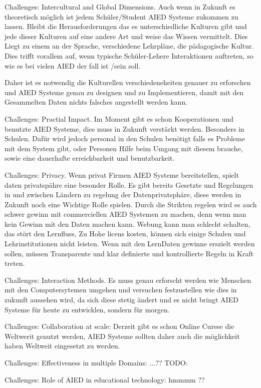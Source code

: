 Challenges: Intercultural and Global Dimensions. Auch wenn in Zukunft es theoretisch möglich ist jedem Schüler/Student AIED Systeme zukommen zu lassen.
 Bleibt die Herausforderungen das es unterschiedliche Kulturen gibt und jede dieser Kulturen auf eine andere Art und weise das Wissen vermittelt. Dies Liegt zu einem an der Sprache, 
 verschiedene Lehrpläne, die pädagogische Kultur. Dies trifft vorallem auf, wenn typische Schüler-Lehere Interaktionen auftreten, so wie es bei vielen AIED der fall ist /sein soll.

 Daher ist es notwendig die Kulturellen verschiedeneheiten genauer zu erforschen und AIED Systeme genau zu designen und zu Implementieren, damit mit den Gesammelten Daten nichts falsches angestellt werden kann.

 Challenges: Practial Impact. Im Moment gibt es schon Kooperationen und benutzte AIED Systeme, dies muss in Zukunft verstärkt werden. Besonders in Schulen. Dafür wird jedoch personal in den Schulen benötigt
 falls es Probleme mit dem System gibt, oder Personen Hilfe beim Umgang mit diesem brauche, sowie eine dauerhafte erreichbarkeit und benutzbarkeit.


 Challenges: Privacy. Wenn privat Firmen AIED Systeme bereitstellen, spielt daten privatspähre eine besonder Rolle. Es gibt bereits Gesetzte und Regelungen in und zwischen Ländern zu regelung der Datenprivatsphäre, diese 
 werden in Zukunft noch eine Wichtige Rolle spielen. Durch die Strikten regelen wird es auch schwer gewinn mit commerciellen AIED Systemen zu machen, denn wenn man kein Gewinn mit den Daten machen kann. Webung kann man schlecht schalten, das stört den Lernfluss,
 Zu Hohe licens kosten, können sich einige Schulen und Lehrinstitutionen nicht leisten. Wenn mit den LernDaten gewinne erszielt werden sollen, müssen Transparente und klar definierte und kontrollierte Regeln in Kraft treten.


 Challenges: Interaction Methods. Es muss genau erforscht werden wie Menschen mit den Computersytemen umgehen und versuchen festzustellen wie dies in zukunft aussehen wird, da sich diese stetig ändert und es nicht bringt
 AIED Systeme für heute zu entwicklen, sondern für morgen.


 Challenges: Collaboration at scale: Derzeit gibt es schon Online Curese die Weltwerit genutzt werden, AIED Systeme sollten daher auch die möglichkeit haben Weltweit eingesetzt zu werden.

 Challenges: Effectiveness in multiple Domains: ...?? TODO:


 Challenges: Role of AIED in educational technology: hmmmm ??
